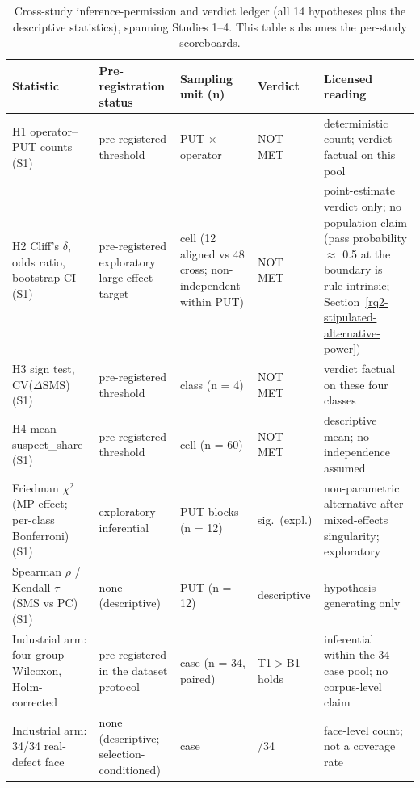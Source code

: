 \documentclass[manuscript,screen,review]{acmart}
\begin{document}
{%
\scriptsize
\begin{longtable}[]{@{}
  >{\raggedright\arraybackslash}p{}
  >{\raggedright\arraybackslash}p{}
  >{\raggedright\arraybackslash}p{}
  >{\raggedright\arraybackslash}p{}
  >{\raggedright\arraybackslash}p{}@{}}
\caption{Cross-study inference-permission and verdict ledger (all 14 hypotheses
plus the descriptive statistics), spanning Studies 1--4. This
table subsumes the per-study scoreboards.}\label{tab:inference-permissions}\\
\toprule\noalign{}
Statistic & Pre-registration status & Sampling unit (n) & Verdict & Licensed reading \\
\midrule\noalign{}
\endfirsthead
\endhead
\bottomrule\noalign{}
\endlastfoot
H1 operator--PUT counts (S1) & pre-registered threshold & PUT $\times$
operator & NOT MET & deterministic count; verdict factual on this pool \\
H2 Cliff's $\delta$, odds ratio, bootstrap CI (S1) & pre-registered
exploratory large-effect target & cell (12 aligned vs 48 cross;
non-independent within PUT) & NOT MET & point-estimate verdict only; no
population claim (pass probability $\approx$ 0.5 at the boundary is
rule-intrinsic; Section~\ref{rq2-stipulated-alternative-power}) \\
H3 sign test, CV($\Delta$SMS) (S1) & pre-registered threshold & class (n = 4)
& NOT MET & verdict factual on these four classes \\
H4 mean suspect\_share (S1) & pre-registered threshold & cell (n = 60) &
NOT MET & descriptive mean; no independence assumed \\
Friedman $\chi^2$ (MP effect; per-class Bonferroni) (S1) & exploratory
inferential & PUT blocks (n = 12) & sig.\ (expl.) & non-parametric alternative after
mixed-effects singularity; exploratory \\
Spearman $\rho$ / Kendall $\tau$ (SMS vs PC) (S1) & none (descriptive) & PUT
(n = 12) & descriptive & hypothesis-generating only \\
Industrial arm: four-group Wilcoxon, Holm-corrected & pre-registered in
the dataset protocol & case (n = 34, paired) & T1$>$B1 holds & inferential within the
34-case pool; no corpus-level claim \\
Industrial arm: 34/34 real-defect face & none (descriptive; selection-conditioned) & case &
34/34 & face-level count; not a coverage rate \\

\end{longtable}}
\end{document}
